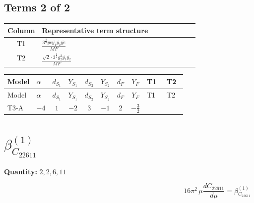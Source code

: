 \documentclass[8pt]{article}
\begin{document}
\begin{landscape}
\subsection*{Terms 2 of 2}
\begin{center}
\begin{tabular}{@{}c >{\raggedright\arraybackslash}p{0.82\linewidth}@{}}
\toprule
Column & Representative term structure \\
\midrule
T1 & \(\displaystyle \frac{3^{\frac{3}{4}} ye \overline{y_{1}} \overline{y_{2}} \overline{ye}}{MF}\) \\
\midrule
T2 & \(\displaystyle \frac{\sqrt{2} \cdot 3^{\frac{3}{4}} g_{2}^{2} \overline{y_{1}} \overline{y_{2}}}{MF}\) \\
\midrule
\bottomrule
\end{tabular}
\end{center}
\smallskip
\tiny
\begin{longtable}{@{}llcccccc >{\raggedright\arraybackslash}p{0.21\linewidth} >{\raggedright\arraybackslash}p{0.21\linewidth}@{}}
\toprule
Model & $\alpha$ & $d_{S_1}$ & $Y_{S_1}$ & $d_{S_2}$ & $Y_{S_2}$ & $d_F$ & $Y_F$ & T1 & T2 \\
\midrule
\endfirsthead
\toprule
Model & $\alpha$ & $d_{S_1}$ & $Y_{S_1}$ & $d_{S_2}$ & $Y_{S_2}$ & $d_F$ & $Y_F$ & T1 & T2 \\
\midrule
\endhead
T3-A & $-4$ & $1$ & $-2$ & $3$ & $-1$ & $2$ & $-\frac{3}{2}$ & \scriptsize\adjustbox{max width=\linewidth}{$\begin{gathered} - \frac{3^{\frac{3}{4}} ye \overline{y_{1}} \overline{y_{2}} \overline{ye}}{12 MF}\end{gathered}$} & \scriptsize\adjustbox{max width=\linewidth}{$\begin{gathered} \frac{\sqrt{2} \cdot 3^{\frac{3}{4}} g_{2}^{2} \overline{y_{1}} \overline{y_{2}}}{3 MF}\end{gathered}$} \\
\midrule
\bottomrule
\end{longtable}
\clearpage
\section*{$\beta_{C_{22611}}^{(1)}$}
\noindent\textbf{Quantity: }$\mathrm{2,2,6,11}$\par\smallskip
\[16\pi^2\,\mu\frac{d C_{22611}}{d\mu}=\beta_{C_{22611}}^{(1)}\]

\end{landscape}
\end{document}
